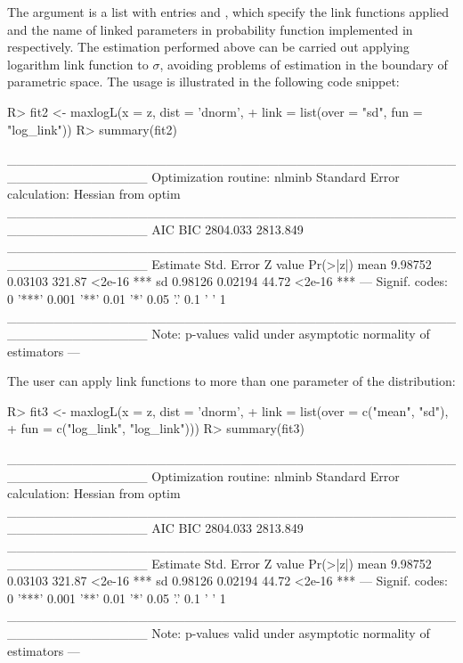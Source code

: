 \documentclass[nojss]{jss}
\begin{document}
The  argument is a list with entries  and , which specify the link functions applied and the name of linked parameters in probability function implemented in  respectively. The estimation performed above can be carried out applying logarithm link function to $\sigma$, avoiding problems of estimation in the boundary of parametric space. The usage is illustrated in the following code snippet:

\begin{Schunk}
\begin{Sinput}
R> fit2 <- maxlogL(x = z, dist = 'dnorm',
+                  link = list(over = "sd", fun = "log_link"))
R> summary(fit2)
\end{Sinput}
\begin{Soutput}
_______________________________________________________________
Optimization routine: nlminb 
Standard Error calculation: Hessian from optim 
_______________________________________________________________
       AIC      BIC
  2804.033 2813.849
_______________________________________________________________
     Estimate  Std. Error Z value Pr(>|z|)    
mean   9.98752    0.03103  321.87   <2e-16 ***
sd     0.98126    0.02194   44.72   <2e-16 ***
---
Signif. codes:  0 '***' 0.001 '**' 0.01 '*' 0.05 '.' 0.1 ' ' 1
_______________________________________________________________
Note: p-values valid under asymptotic normality of estimators 
---
\end{Soutput}
\end{Schunk}

The user can apply link functions to more than one parameter of the distribution:

\begin{Schunk}
\begin{Sinput}
R> fit3 <- maxlogL(x = z, dist = 'dnorm',
+                  link = list(over = c("mean", "sd"),
+                              fun = c("log_link", "log_link")))
R> summary(fit3)
\end{Sinput}
\begin{Soutput}
_______________________________________________________________
Optimization routine: nlminb 
Standard Error calculation: Hessian from optim 
_______________________________________________________________
       AIC      BIC
  2804.033 2813.849
_______________________________________________________________
     Estimate  Std. Error Z value Pr(>|z|)    
mean   9.98752    0.03103  321.87   <2e-16 ***
sd     0.98126    0.02194   44.72   <2e-16 ***
---
Signif. codes:  0 '***' 0.001 '**' 0.01 '*' 0.05 '.' 0.1 ' ' 1
_______________________________________________________________
Note: p-values valid under asymptotic normality of estimators 
---
\end{Soutput}
\end{Schunk}
\end{document}
